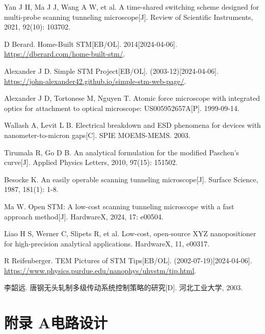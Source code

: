 \documentclass{article}
\begin{document}
\begin{spacing}{1.625}
\begin{thebibliography}{25}
	 Yan J H, Ma J J, Wang A W, et al. A time-shared switching scheme designed for multi-probe scanning tunneling microscope[J]. Review of Scientific Instruments, 2021, 92(10): 103702.
	
	 D Berard. Home-Built STM[EB/OL]. 2014[2024-04-06]. \href{https://dberard.com/home-built-stm/}{https://dberard.com/home-built-stm/}.
	
	 Alexander J D. Simple STM Project[EB/OL]. (2003-12)[2024-04-06]. \href{https://john-alexander42.github.io/simple-stm-web-page/}{https://john-alexander42.github.io/simple-stm-web-page/}.
	
	 Alexander J D, Tortonese M, Nguyen T. Atomic force microscope with integrated optics for attachment to optical microscope: US005952657A[P]. 1999-09-14.
	
	 Wallash A, Levit L B. Electrical breakdown and ESD phenomena for devices with nanometer-to-micron gaps[C]. SPIE MOEMS-MEMS. 2003. 
	
	 Tirumala R, Go D B. An analytical formulation for the modified Paschen’s curve[J]. Applied Physics Letters, 2010, 97(15): 151502.
	
	 Besocke K. An easily operable scanning tunneling microscope[J]. Surface Science, 1987, 181(1): 1-8.
	
	 Ma W. Open STM: A low-cost scanning tunneling microscope with a fast approach method[J]. HardwareX, 2024, 17: e00504.
	
	 Liao H S, Werner C, Slipets R, et al. Low-cost, open-source XYZ nanopositioner for high-precision analytical applications. HardwareX, 11, e00317.
	
	 R Reifenberger. TEM Pictures of STM Tips[EB/OL]. (2002-07-19)[2024-04-06]. \href{https://www.physics.purdue.edu/nanophys/uhvstm/tip.html}{https://www.physics.purdue.edu/nanophys/uhvstm/tip.html}.
	
	 李韶远. 唐钢无头轧制多级传动系统控制策略的研究[D]. 河北工业大学, 2003.
	
	
\end{thebibliography}


\end{spacing}


\newpage
\appendix
\section*{附录 A\quad 电路设计}
\label{app:A}
\end{document}
